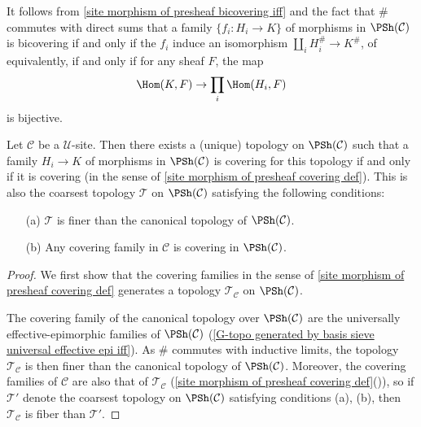 \begin{remark}
It follows from \cref{site morphism of presheaf bicovering iff} and the fact that $\#$ commutes with direct sums that a family $\{f_i:H_i\to K\}$ of morphisms in $\PSh(\mathcal{C})$ is bicovering if and only if the $f_i$ induce an isomorphism $\coprod_iH_i^\#\to K^\#$, of equivalently, if and only if for any sheaf $F$, the map
\[\Hom(K,F)\to \prod_i\Hom(H_i,F)\]
is bijective.
\end{remark}
\begin{proposition}\label{site induced topology on PSh char}
Let $\mathcal{C}$ be a $\mathscr{U}$-site. Then there exists a (unique) topology on $\PSh(\mathcal{C})$ such that a family $H_i\to K$ of morphisms in $\PSh(\mathcal{C})$ is covering for this topology if and only if it is covering (in the sense of \cref{site morphism of presheaf covering def}). This is also the coarsest topology $\mathcal{T}$ on $\PSh(\mathcal{C})$ satisfying the following conditions:
\begin{enumerate}
\item[(a)] $\mathcal{T}$ is finer than the canonical topology of $\PSh(\mathcal{C})$.
\item[(b)] Any covering family in $\mathcal{C}$ is covering in $\PSh(\mathcal{C})$.
\end{enumerate}
\end{proposition}
\begin{proof}
We first show that the covering families in the sense of \cref{site morphism of presheaf covering def} generates a topology $\mathcal{T}_\mathcal{C}$ on $\PSh(\mathcal{C})$.\par 
The covering family of the canonical topology over $\PSh(\mathcal{C})$ are the universally effective-epimorphic families of $\PSh(\mathcal{C})$ (\cref{G-topo generated by basis sieve universal effective epi iff}). As $\#$ commutes with inductive limits, the topology $\mathcal{T}_\mathcal{C}$ is then finer than the canonical topology of $\PSh(\mathcal{C})$. Moreover, the covering families of $\mathcal{C}$ are also that of $\mathcal{T}_\mathcal{C}$ (\cref{site morphism of presheaf covering def}()), so if $\mathcal{T}'$ denote the coarsest topology on $\PSh(\mathcal{C})$ satisfying conditions (a), (b), then $\mathcal{T}_\mathcal{C}$ is fiber than $\mathcal{T}'$. 
\end{proof}
